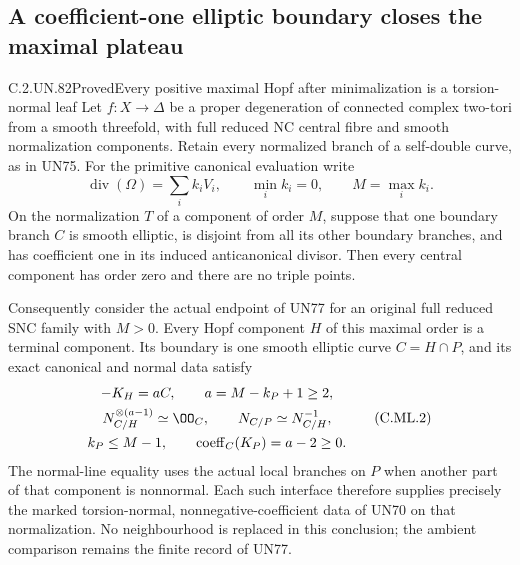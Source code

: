 \subsection{A coefficient-one elliptic boundary closes the maximal plateau}

\begin{statement}{C.2.UN.82}{Proved}{Every positive maximal Hopf after minimalization is a torsion-normal leaf}
Let \(f:X\to\Delta\) be a proper degeneration of connected
complex two-tori from a smooth threefold, with full reduced
NC central fibre and smooth normalization components. Retain
every normalized branch of a self-double curve, as in UN75.
For the primitive canonical evaluation write
\[
       \operatorname{div}(\Omega)=\sum_i k_iV_i,
       \qquad \min_i k_i=0,\qquad M=\max_i k_i .
\tag{C.ML.1}
\]
On the normalization \(T\) of a component of order \(M\),
suppose that one boundary branch \(C\) is smooth elliptic,
is disjoint from all its other boundary branches, and has
coefficient one in its induced anticanonical divisor.
Then every central component has order zero and there
are no triple points.

Consequently consider the actual endpoint of UN77 for
an original full reduced SNC family with \(M>0\).
Every Hopf component \(H\) of this maximal order is a
terminal component. Its boundary is one smooth elliptic
curve \(C=H\cap P\), and its exact canonical and normal
data satisfy
\[
 \begin{gathered}
       -K_H=aC,\qquad a=M-k_P+1\ge2,\\
       N_{C/H}^{\otimes(a-1)}\simeq\OO_C,
       \qquad N_{C/P}\simeq N_{C/H}^{-1},\\
       k_P\le M-1,\qquad
       \operatorname{coeff}_C(K_P)=a-2\ge0 .
 \end{gathered}
\tag{C.ML.2}
\]
The normal-line equality uses the actual local branches
on \(P\) when another part of that component is nonnormal.
Each such interface therefore supplies precisely the
marked torsion-normal, nonnegative-coefficient data of
UN70 on that normalization. No neighbourhood is replaced
in this conclusion; the ambient comparison remains the
finite record of UN77.
\end{statement}

